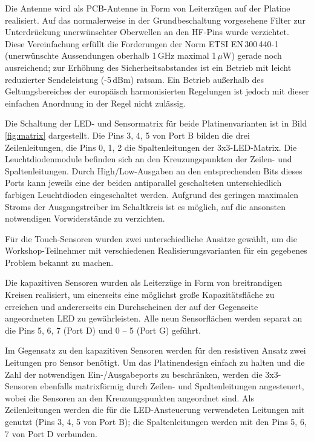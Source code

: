 \documentclass{clt2012}
\renewcommand{\figurename}{Bild}
\begin{document}
Die Antenne wird als PCB-Antenne in Form von Leiterzügen auf der Platine realisiert. Auf das normalerweise in der
Grundbeschaltung vorgesehene Filter zur Unterdrückung unerwünschter Oberwellen an den HF-Pins wurde verzichtet.
Diese Vereinfachung erfüllt die Forderungen der Norm ETSI EN\,300\,440-1
(unerwünschte Aussendungen oberhalb 1\,GHz maximal 1\,$\mu$W) gerade noch
ausreichend; zur Erhöhung des Sicherheitsabstandes ist ein Betrieb mit
leicht reduzierter Sendeleistung (-5\,dBm) ratsam.  Ein Betrieb außerhalb
des Geltungsbereiches der europäisch harmonisierten Regelungen ist jedoch
mit dieser einfachen Anordnung in der Regel nicht zulässig.


Die Schaltung der LED- und Sensormatrix für beide Platinenvarianten ist in \figurename{} \ref{fig:matrix} dargestellt.
Die Pins 3, 4, 5 von Port B bilden die drei Zeilenleitungen, die Pins 0, 1, 2 die Spaltenleitungen der 3x3-LED-Matrix. Die Leuchtdiodenmodule befinden sich an den Kreuzungspunkten der Zeilen- und Spaltenleitungen. Durch High/Low-Ausgaben an den entsprechenden Bits dieses Ports kann jeweils eine der beiden antiparallel geschalteten unterschiedlich farbigen Leuchtdioden eingeschaltet werden. Aufgrund des geringen maximalen Stroms der Ausgangstreiber im Schaltkreis ist es möglich, auf die ansonsten notwendigen Vorwiderstände zu verzichten. 

Für die Touch-Sensoren wurden zwei unterschiedliche Ansätze gewählt, um die Work\-shop-Teil\-nehmer mit verschiedenen Realisierungsvarianten für ein gegebenes Problem bekannt zu machen.

Die kapazitiven Sensoren wurden als Leiterzüge in Form von breitrandigen Kreisen realisiert, um einerseits eine möglichst große
Kapazitätsfläche zu erreichen und andererseits ein Durchscheinen der auf der Gegenseite angeordneten LED zu gewährleisten.
Alle neun Sensorflächen werden separat an die Pins 5, 6, 7 (Port D) und 0 -- 5 (Port G) geführt.

Im Gegensatz zu den kapazitiven Sensoren werden für den resistiven Ansatz zwei Leitungen pro Sensor benötigt.
Um das Platinendesign einfach zu  halten und die Zahl der notwendigen Ein-/Ausgabeports zu beschränken, 
werden die 3x3-Sensoren ebenfalls matrixförmig durch Zeilen- und Spaltenleitungen angesteuert,
wobei die Sensoren an den Kreuzungspunkten angeordnet sind. Als Zeilenleitungen werden die für
die LED-Ansteuerung verwendeten Leitungen mit genutzt (Pins 3, 4, 5 von Port B); die Spaltenleitungen
werden mit den Pins 5, 6, 7 von Port D verbunden.
\end{document}
